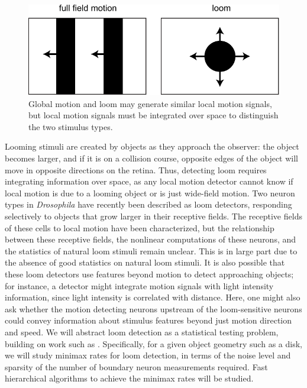 \setlength{\columnsep}{10pt}
\begin{figure}
\centering
\includegraphics[width=.44\textwidth]{figs/loom}
\caption{\small Global motion and loom may generate similar local
motion signals, but local motion signals must be integrated over space
to distinguish the two stimulus types.}
    \label{fig:loom}
\vskip-2pt
\end{figure}

Looming stimuli are created by objects as they approach the observer:
the object becomes larger, and if it is on a collision course,
opposite edges of the object will move in opposite directions on the
retina. Thus, detecting loom requires integrating information over
space, as any local motion detector cannot know if local motion is due
to a looming object or is just wide-field motion. Two neuron types in
\textit{Drosophila} have recently been described as loom detectors,
responding selectively to objects that grow larger in their receptive
fields. The receptive fields of these cells to local motion have been
characterized, but the relationship between these receptive fields,
the nonlinear computations of these neurons, and the statistics of
natural loom stimuli remain unclear. This is in large part due to the
absence of good statistics on natural loom stimuli. It is also
possible that these loom detectors use features beyond motion to
detect approaching objects; for instance, a detector might integrate
motion signals with light intensity information, since light intensity
is correlated with distance. Here, one might also ask whether the
motion detecting neurons upstream of the loom-sensitive neurons could
convey information about stimulus features beyond just motion
direction and speed. We will abstract loom detection as a statistical
testing problem, building on work such
as \citep{castro:05,huo:06,hc:04}.  Specifically, for a given object
geometry such as a disk, we will study minimax rates for loom
detection, in terms of the noise level and sparsity of the number of
boundary neuron measurements required. Fast hierarchical algorithms
to achieve the minimax rates will be studied.



